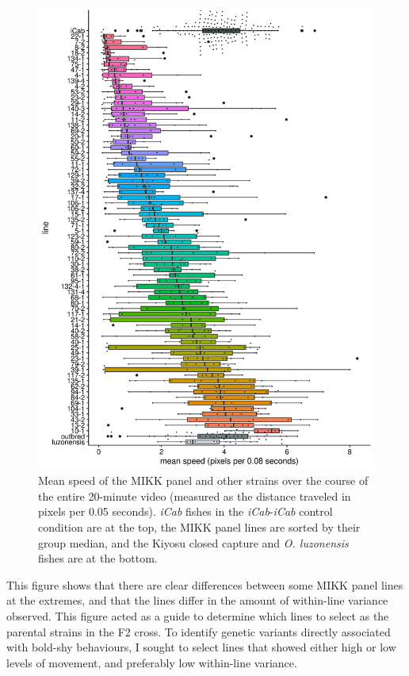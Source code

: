\documentclass[
]{article}
\begin{document}
\begin{figure}
\includegraphics[width=1\linewidth]{figs/mikk_behaviour/F0_line_mean_speed_0.08} \caption{Mean speed of the MIKK panel and other strains over the course of the entire 20-minute video (measured as the distance traveled in pixels per 0.05 seconds). \emph{\textcolor{iCab_424B4D}{iCab}} fishes in the \emph{\textcolor{iCab_424B4D}{iCab}}-\emph{\textcolor{iCab_424B4D}{iCab}} control condition are at the top, the MIKK panel lines are sorted by their group median, and the Kiyosu closed capture and \emph{O. luzonensis} fishes are at the bottom.}\label{fig:mikk-mean-speed}
\end{figure}

This figure shows that there are clear differences between some MIKK panel lines at the extremes, and that the lines differ in the amount of within-line variance observed. This figure acted as a guide to determine which lines to select as the parental strains in the F2 cross. To identify genetic variants directly associated with bold-shy behaviours, I sought to select lines that showed either high or low levels of movement, and preferably low within-line variance.
\end{document}

